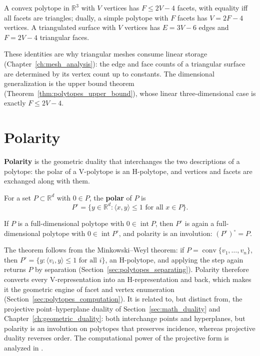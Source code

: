 \begin{theorem}\label{thm:polytopes_upper_bound_3d}
  A convex polytope in $\mathbb{R}^3$ with $V$ vertices has $F \le 2V - 4$
  facets, with equality iff all facets are triangles; dually, a simple
  polytope with $F$ facets has $V = 2F - 4$ vertices. A triangulated surface
  with $V$ vertices has $E = 3V - 6$ edges and $F = 2V - 4$ triangular
  faces.
\end{theorem}

These identities are why triangular meshes consume linear storage
(Chapter~\ref{ch:mesh_analysis}): the edge and face counts of a triangular
surface are determined by its vertex count up to constants. The
dimensional generalization is the upper bound theorem
(Theorem~\ref{thm:polytopes_upper_bound}), whose linear three-dimensional
case is exactly $F \le 2V - 4$.


\section{Polarity}
\label{sec:polytopes_polarity}

\textbf{Polarity} is the geometric duality that interchanges the two
descriptions of a polytope: the polar of a V-polytope is an H-polytope, and
vertices and facets are exchanged along with them.

\begin{definition}[Polar]\label{def:polytopes_polar}
  For a set $P \subset \mathbb{R}^d$ with $0 \in P$, the \textbf{polar} of
  $P$ is
  \[
    P^{\circ} = \{ y \in \mathbb{R}^d : \langle x, y \rangle \le 1
      \text{ for all } x \in P \} .
  \]
\end{definition}

\begin{theorem}\label{thm:polytopes_polar_duality}
  If $P$ is a full-dimensional polytope with $0 \in \operatorname{int} P$,
  then $P^{\circ}$ is again a full-dimensional polytope with
  $0 \in \operatorname{int} P^{\circ}$, and polarity is an involution:
  $(P^{\circ})^{\circ} = P$.
\end{theorem}

The theorem follows from the Minkowski--Weyl theorem: if
$P = \operatorname{conv}\{v_1, \dots, v_n\}$, then
$P^{\circ} = \{ y : \langle v_i, y \rangle \le 1 \text{ for all } i \}$, an
H-polytope, and applying the step again returns $P$ by separation
(Section~\ref{sec:polytopes_separating}). Polarity therefore converts every
V-representation into an H-representation and back, which makes it the
geometric engine of facet and vertex enumeration
(Section~\ref{sec:polytopes_computation}). It is related to, but distinct
from, the projective point--hyperplane duality of Section~\ref{sec:math_duality}
and Chapter~\ref{ch:geometric_duality}: both interchange points and
hyperplanes, but polarity is an involution on polytopes that preserves
incidence, whereas projective duality reverses order. The computational
power of the projective form is analyzed in \cite{chazelle1985power}.

